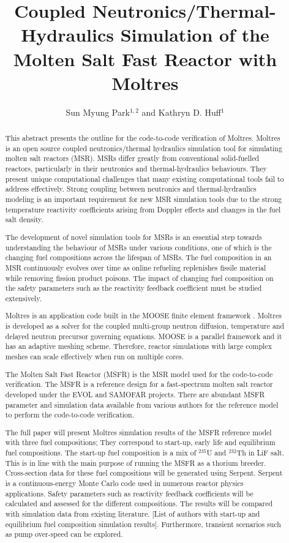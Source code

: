 \documentclass{anstrans}
\title{Coupled Neutronics/Thermal-Hydraulics Simulation of the Molten Salt Fast Reactor with Moltres}
\author{Sun Myung Park$^{1,2}$ and Kathryn D. Huff$^1$}
\institute{$^1$Dept. of Nuclear, Plasma and Radiological Engineering, University of Illinois at Urbana-Champaign \\
$^2$smpark3@illinois.edu}
\begin{document}
\begin{abstract}
%
This abstract presents the outline for the code-to-code verification of Moltres.
Moltres \cite{lindsay_introduction_2018} is an open source coupled neutronics/thermal hydraulics simulation tool for simulating molten salt reactors (MSR).
MSRs differ greatly from conventional solid-fuelled reactors, particularly in their neutronics and thermal-hydraulics behaviours.
They present unique computational challenges that many existing computational tools fail to address effectively.
Strong coupling between neutronics and thermal-hydraulics modeling is an important requirement for new MSR simulation tools due to the strong temperature reactivity coefficients arising from Doppler effects and changes in the fuel salt density. 

The development of novel simulation tools for MSRs is an essential step towards understanding the behaviour of MSRs under various conditions, one of which is the changing fuel compositions across the lifespan of MSRs.
The fuel composition in an MSR continuously evolves over time as online refueling replenishes fissile material while removing fission product poisons. The impact of changing fuel composition on the safety parameters such as the reactivity feedback coefficient must be studied extensively.

Moltres is an application code built in the MOOSE finite element framework \cite{gaston_moose:_2009}.
Moltres is developed as a solver for the coupled multi-group neutron diffusion, temperature and delayed neutron precursor governing equations.
MOOSE is a parallel framework and it has an adaptive meshing scheme.
Therefore, reactor simulations with large complex meshes can scale effectively when run on multiple cores. 

The Molten Salt Fast Reactor (MSFR) is the MSR model used for the code-to-code verification.
The MSFR is a reference design for a fast-spectrum molten salt reactor developed under the EVOL and SAMOFAR projects\cite{serp_molten_2014}.
There are abundant MSFR parameter and simulation data available from various authors \cite{fiorina_modelling_2014} \cite{pettersen_coupled_2016} for the reference model to perform the code-to-code verification.

The full paper will present Moltres simulation results of the MSFR reference model with three fuel compositions;
They correspond to start-up, early life and equilibrium fuel compositions.
The start-up fuel composition is a mix of $^{235}$U and $^{232}$Th in LiF salt.
This is in line with the main purpose of running the MSFR as a thorium breeder.
Cross-section data for these fuel compositions will be generated using Serpent.
Serpent \cite{leppanen_serpent_2015} is a continuous-energy Monte Carlo code used in numerous reactor physics applications.
Safety parameters such as reactivity feedback coefficients will be calculated and assessed for the different compositions.
The results will be compared with simulation data from existing literature.
[List of authors with start-up and equilibrium fuel composition simulation results].
Furthermore, transient scenarios such as pump over-speed can be explored.

\end{abstract}



\end{document}
